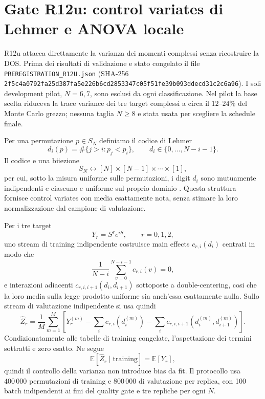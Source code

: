 \documentclass[11pt,a4paper]{article}
\begin{document}
\section{Gate R12u: control variates di Lehmer e ANOVA locale}

R12u attacca direttamente la varianza dei momenti complessi senza ricostruire la DOS. Prima dei risultati di validazione e stato congelato il file \texttt{PREREGISTRATION\_R12U.json} (SHA-256 \texttt{2f5c4a0792fa25d387fa5e226b6cd2853347c05f51fe39b093ddecd31c2c6a96}). I soli development pilot, $N=6,7$, sono esclusi da ogni classificazione. Nel pilot la base scelta riduceva la trace variance dei tre target complessi a circa il $12$--$24\%$ del Monte Carlo grezzo; nessuna taglia $N\ge8$ e stata usata per scegliere la schedule finale.

Per una permutazione $p\in S_N$ definiamo il codice di Lehmer
\begin{equation}
 d_i(p)=\#\{j>i:p_j<p_i\},\qquad d_i\in\{0,\ldots,N-i-1\}.
\end{equation}
Il codice e una biiezione
\begin{equation}
 S_N\longleftrightarrow [N]\times[N-1]\times\cdots\times[1],
\end{equation}
per cui, sotto la misura uniforme sulle permutazioni, i digit $d_i$ sono mutuamente indipendenti e ciascuno e uniforme sul proprio dominio \cite{Lehmer1960}. Questa struttura fornisce control variates con media esattamente nota, senza stimare la loro normalizzazione dal campione di valutazione.

Per i tre target
\begin{equation}
 Y_r=S^r e^{iS},\qquad r=0,1,2,
\end{equation}
uno stream di training indipendente costruisce main effects $c_{r,i}(d_i)$ centrati in modo che
\begin{equation}
 \frac{1}{N-i}\sum_{v=0}^{N-i-1}c_{r,i}(v)=0,
\end{equation}
e interazioni adiacenti $c_{r,i,i+1}(d_i,d_{i+1})$ sottoposte a double-centering, cosi che la loro media sulla legge prodotto uniforme sia anch'essa esattamente nulla. Sullo stream di valutazione indipendente si usa quindi
\begin{equation}
 \widehat Z_r=\frac1M\sum_{m=1}^{M}\left[Y_r^{(m)}-\sum_i c_{r,i}(d_i^{(m)})-\sum_i c_{r,i,i+1}(d_i^{(m)},d_{i+1}^{(m)})\right].
 \label{eq:r12uCV}
\end{equation}
Condizionatamente alle tabelle di training congelate, l'aspettazione dei termini sottratti e zero esatto. Ne segue
\begin{equation}
 \mathbb E[\widehat Z_r\mid\mathrm{training}]=\mathbb E[Y_r],
\end{equation}
quindi il controllo della varianza non introduce bias da fit. Il protocollo usa $400\,000$ permutazioni di training e $800\,000$ di valutazione per replica, con 100 batch indipendenti ai fini del quality gate e tre repliche per ogni $N$.
\end{document}
